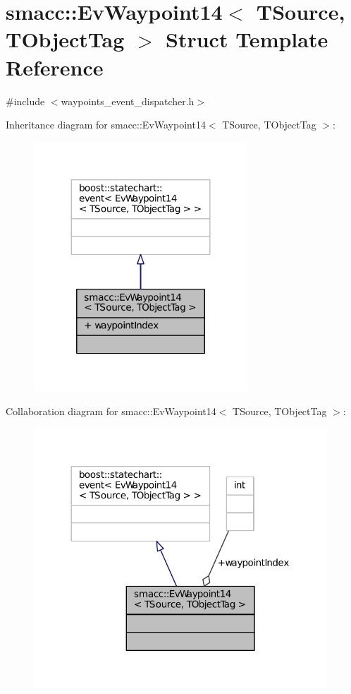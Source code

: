 \hypertarget{structsmacc_1_1EvWaypoint14}{}\section{smacc\+:\+:Ev\+Waypoint14$<$ T\+Source, T\+Object\+Tag $>$ Struct Template Reference}
\label{structsmacc_1_1EvWaypoint14}


{\ttfamily \#include $<$waypoints\+\_\+event\+\_\+dispatcher.\+h$>$}



Inheritance diagram for smacc\+:\+:Ev\+Waypoint14$<$ T\+Source, T\+Object\+Tag $>$\+:
\nopagebreak
\begin{figure}[H]
\begin{center}
\leavevmode
\includegraphics[width=227pt]{structsmacc_1_1EvWaypoint14__inherit__graph}
\end{center}
\end{figure}


Collaboration diagram for smacc\+:\+:Ev\+Waypoint14$<$ T\+Source, T\+Object\+Tag $>$\+:
\nopagebreak
\begin{figure}[H]
\begin{center}
\leavevmode
\includegraphics[width=312pt]{structsmacc_1_1EvWaypoint14__coll__graph}
\end{center}
\end{figure}
